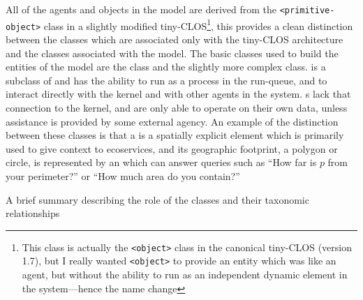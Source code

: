 All of the agents and objects in the model are derived
from the \texttt{<primitive-object>} class in a slightly modified
tiny-CLOS\footnote{This class is actually the \texttt{<object>} class in
  the canonical tiny-CLOS (version 1.7), but I really wanted
  \texttt{<object>} to provide an entity which was like an agent, but
  without the ability to run as an independent dynamic element in the
  system---hence the name change}, this provides a clean distinction
between the classes which are associated only with the tiny-CLOS
architecture and the classes associated with the model.  The basic
classes used to build the entities of the model are the
 class and the slightly more complex 
class.  is a subclass of  and has the ability to
run as a process in the run-queue, and to interact directly with the
kernel and with other agents in the system.  s lack that
connection to the kernel, and are only able to operate on their own
data, unless assistance is provided by some external agency.  An
example of the distinction between these classes is that a 
is a spatially explicit  element which is primarily used to
give context to ecoservices, and its geographic footprint, a polygon
or circle, is represented by an  which can answer queries
such as ``How far is $p$ from your perimeter?'' or ``How much area do
you contain?'' 

A brief summary describing the role of the classes and their taxonomic
relationships 

